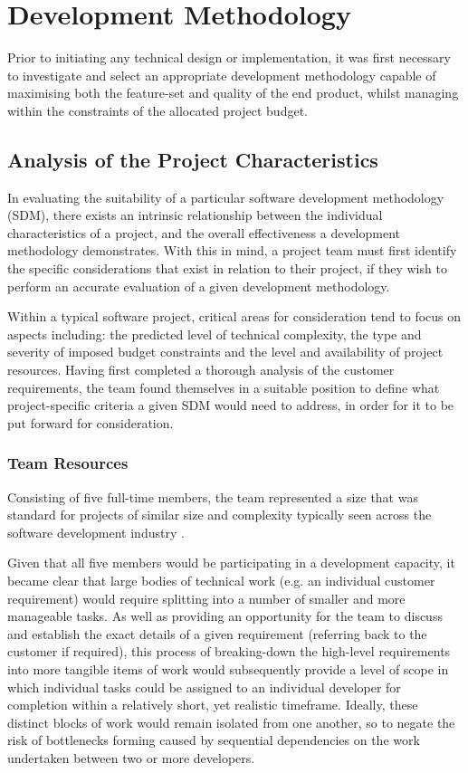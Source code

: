 \chapter{Development Methodology}

Prior to initiating any technical design or implementation, it was first necessary to investigate and select an appropriate development methodology capable of maximising both the feature-set and quality of the end product, whilst managing within the constraints of the allocated project budget.

\section{Analysis of the Project Characteristics}

In evaluating the suitability of a particular software development methodology (SDM), there exists an intrinsic relationship between the individual characteristics of a project, and the overall effectiveness a development methodology demonstrates. With this in mind, a project team must first identify the specific considerations that exist in relation to their project, if they wish to perform an accurate evaluation of a given development methodology.

Within a typical software project, critical areas for consideration tend to focus on aspects including: the predicted level of technical complexity, the type and severity of imposed budget constraints and the level and availability of project resources. Having first completed a thorough analysis of the customer requirements, the team found themselves in a suitable position to define what project-specific criteria a given SDM would need to address, in order for it to be put forward for consideration.

\subsection{Team Resources} 

Consisting of five full-time members, the team represented a size that was standard for projects of similar size and complexity typically seen across the software development industry \cite{scrum}. 

Given that all five members would be participating in a development capacity, it became clear that large bodies of technical work (e.g. an individual customer requirement) would require splitting into a number of smaller and more manageable tasks. As well as providing an opportunity for the team to discuss and establish the exact details of a given requirement (referring back to the customer if required), this process of breaking-down the high-level requirements into more tangible items of work would subsequently provide a level of scope in which individual tasks could be assigned to an individual developer for completion within a relatively short, yet realistic timeframe. Ideally, these distinct blocks of work would remain isolated from one another, so to negate the risk of bottlenecks forming caused by sequential dependencies on the work undertaken between two or more developers.

